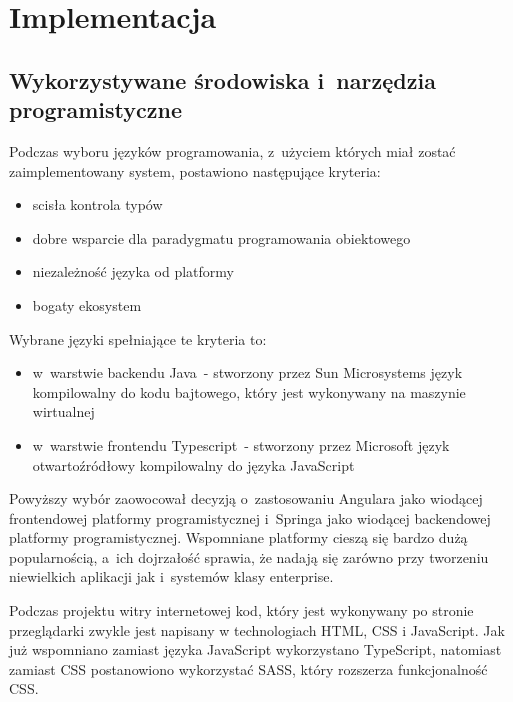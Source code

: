 \chapter{Implementacja}\label{ch:implementation}
\section{Wykorzystywane środowiska i~narzędzia programistyczne}\label{sec:dev-tools}

Podczas wyboru języków programowania, z~użyciem których miał zostać zaimplementowany system, postawiono następujące kryteria:

\begin{itemize}
    \item scisła kontrola typów
    \item dobre wsparcie dla paradygmatu programowania obiektowego
    \item niezależność języka od platformy
    \item bogaty ekosystem
\end{itemize}

Wybrane języki spełniające te kryteria to:

\begin{itemize}
    \item w~warstwie backendu Java\cite{tech:java}~- stworzony przez Sun Microsystems język kompilowalny do kodu bajtowego, który jest wykonywany na maszynie wirtualnej
    \item w~warstwie frontendu Typescript\cite{tech:typescript}~- stworzony przez Microsoft język otwartoźródłowy kompilowalny do języka JavaScript\cite{tech:javascript}
\end{itemize}

Powyższy wybór zaowocował decyzją o~zastosowaniu Angulara\cite{tech:angular} jako wiodącej frontendowej platformy programistycznej
i~Springa\cite{tech:spring} jako wiodącej backendowej platformy programistycznej.
Wspomniane platformy cieszą się bardzo dużą popularnością, a~ich dojrzałość sprawia,
że nadają się zarówno przy tworzeniu niewielkich aplikacji jak i~systemów klasy enterprise.

\par
Podczas projektu witry internetowej kod, który jest wykonywany po stronie przeglądarki zwykle jest napisany w technologiach HTML, CSS\cite{tech:html-css} i JavaScript\cite{tech:javascript}.
Jak już wspomniano zamiast języka JavaScript wykorzystano TypeScript, natomiast zamiast CSS postanowiono wykorzystać SASS\cite{tech:sass}, który rozszerza funkcjonalność CSS.

